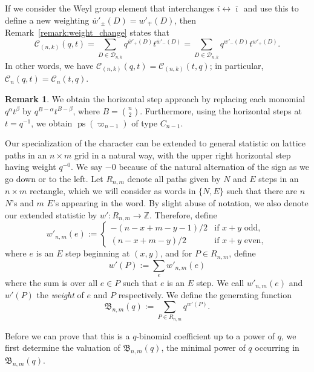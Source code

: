 \documentclass[11pt, leqno]{amsart}
\theoremstyle{plain}
\theoremstyle{definition}
\newtheorem{remark}[theorem]{Remark}
\numberwithin{equation}{section}
\newcommand{\fw}{\varpi} %
\newcommand{\seteq}{\mathbin{:=}}
\newcommand{\Cat}{\mathcal{C}} %
\newcommand{\Dyck}{\mathcal{D}} %
\newcommand{\Z}{\mathbb{Z}}
\newcommand{\B}{\mathfrak{B}}
\newcommand{\ps}{\operatorname{ps}} %
\newcommand{\defn}[1]{{\color{darkred}\emph{#1}}} %
\begin{document}
If we consider the Weyl group element that interchanges $i \leftrightarrow \overline{\imath}$ and use this to define a new weighting $\overline{w}'_{\pm}(D) = w'_{\mp}(D)$, then Remark~\ref{remark:weight_change} states that
\[
\Cat_{(n,k)}(q,t) = \sum_{D \in \Dyck_{n,k}} q^{\overline{w}'_+(D)} t^{\overline{w}'_-(D)} = \sum_{D \in \Dyck_{n,k}} q^{w'_-(D)} t^{w'_+(D)}.
\]
In other words, we have $\Cat_{(n,k)}(q,t) = \Cat_{(n,k)}(t,q)$; in particular, $\Cat_n(q,t) = \Cat_n(t,q)$.

\begin{remark}
We obtain the horizontal step approach by replacing each monomial $q^{\alpha} t^{\beta}$ by $q^{B-\alpha} t^{B-\beta}$, where $B = \binom{n}{2}$.
Furthermore, using the horizontal steps at $t = q^{-1}$, we obtain $\ps(\fw_{n-1})$ of type $C_{n-1}$.
\end{remark}

Our specialization of the character can be extended to general statistic on lattice paths in an $n \times m$ grid in a natural way, with the upper right horizontal step having weight $q^{-0}$. We say $-0$ because of the natural alternation of the sign as we go down or to the left. Let $R_{n,m}$ denote all paths given by $N$ and $E$ steps in an $n \times m$ rectangle, which we will consider as words in $\{N, E\}$ such that there are $n$ $N$'s and $m$ $E$'s appearing in the word. By slight abuse of notation, we also denote our extended statistic by $w' \colon R_{n,m} \to \Z$. Therefore, define
\[
w'_{n,m}(e) \seteq \begin{cases}
-(n - x + m - y - 1) / 2 & \text{if $x + y$ odd}, \\
 (n - x + m - y) / 2 & \text{if $x + y$ even},
\end{cases}
\]
where $e$ is an $E$ step beginning at $(x, y)$, and for $P \in R_{n,m}$, define
\begin{equation}
\label{eq:path_statistic}
w'(P) \seteq \sum_{e} w'_{n,m}(e)
\end{equation}
where the sum is over all $e \in P$ such that $e$ is an $E$ step. We call $w'_{n,m}(e)$ and $w'(P)$ the \defn{weight} of $e$ and $P$ respectively. We define the generating function
\begin{equation}
\label{eq:binomal_statistic}
\B_{n,m}(q) \seteq \sum_{P \in R_{n,m}} q^{w'(P)}.
\end{equation}

Before we can prove that this is a $q$-binomial coefficient up to a power of $q$, we first determine the valuation of $\B_{n,m}(q)$, the minimal power of $q$ occurring in $\B_{n,m}(q)$.
\end{document}
